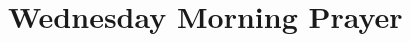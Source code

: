 
\null\medskip{%
\parindent 0pt
\noindent
\ifx\preLilyPondExample \undefined
\else
  \expandafter\preLilyPondExample
\fi
\def\lilypondbook{}%

\ifx\postLilyPondExample \undefined
\else
  \expandafter\postLilyPondExample
\fi
}

\newpage

{%
\parindent 0pt
\noindent
\ifx\preLilyPondExample \undefined
\else
  \expandafter\preLilyPondExample
\fi
\def\lilypondbook{}%

\ifx\postLilyPondExample \undefined
\else
  \expandafter\postLilyPondExample
\fi
}


\null\medskip{%
\parindent 0pt
\noindent
\ifx\preLilyPondExample \undefined
\else
  \expandafter\preLilyPondExample
\fi
\def\lilypondbook{}%

\ifx\postLilyPondExample \undefined
\else
  \expandafter\postLilyPondExample
\fi
}

\newpage

{%
\parindent 0pt
\noindent
\ifx\preLilyPondExample \undefined
\else
  \expandafter\preLilyPondExample
\fi
\def\lilypondbook{}%

\ifx\postLilyPondExample \undefined
\else
  \expandafter\postLilyPondExample
\fi
}


\null\medskip{%
\parindent 0pt
\noindent
\ifx\preLilyPondExample \undefined
\else
  \expandafter\preLilyPondExample
\fi
\def\lilypondbook{}%

\ifx\postLilyPondExample \undefined
\else
  \expandafter\postLilyPondExample
\fi
}

\newpage


\section{Wednesday Morning Prayer}

{%
\parindent 0pt
\noindent
\ifx\preLilyPondExample \undefined
\else
  \expandafter\preLilyPondExample
\fi
\def\lilypondbook{}%

\ifx\postLilyPondExample \undefined
\else
  \expandafter\postLilyPondExample
\fi
}

